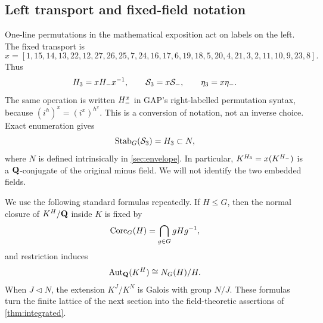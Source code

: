 \subsection{Left transport and fixed-field notation}

One-line permutations in the mathematical exposition act on labels on the
left.  The fixed transport is
\begin{equation}
\label{eq:x-array}
x=[1,15,14,13,22,12,27,26,25,7,24,16,17,6,19,18,5,20,4,21,3,2,11,10,9,23,8].
\end{equation}
Thus
\begin{equation}
 H_{3}=xH_{-} x^{-1},\qquad
 \mathcal{S}_3=x\mathcal{S}_-,\qquad
 \eta_3=x\eta_-.
 \label{eq:left-transport}
\end{equation}
The same operation is written $H_{-}^x$ in GAP's right-labelled
permutation syntax, because $(i^h)^x=(i^x)^{h^x}$.  This is a conversion of
notation, not an inverse choice.  Exact enumeration gives
\begin{equation}
 \operatorname{Stab}_G(\mathcal{S}_3)=H_{3}\subset N,
 \label{eq:transport-stabilizer}
\end{equation}
where $N$ is defined intrinsically in \cref{sec:envelope}.  In particular,
$K^{H_{3}}=x(K^{H_{-}})$ is a $\mathbf{Q}$-conjugate of the original minus
field.  We will not identify the two embedded fields.

We use the following standard formulas repeatedly.  If $H\le G$, then the
normal closure of $K^H/\mathbf{Q}$ inside $K$ is fixed by
\[
 \operatorname{Core}_G(H)=\bigcap_{g\in G}gHg^{-1},
\]
and restriction induces
\begin{equation}
 \operatorname{Aut}_{\mathbf{Q}}(K^H)\cong N_G(H)/H.
 \label{eq:normalizer-aut}
\end{equation}
When $J\triangleleft N$, the extension $K^J/K^N$ is Galois with group
$N/J$.  These formulas turn the finite lattice of the next section into the
field-theoretic assertions of \cref{thm:integrated}.
